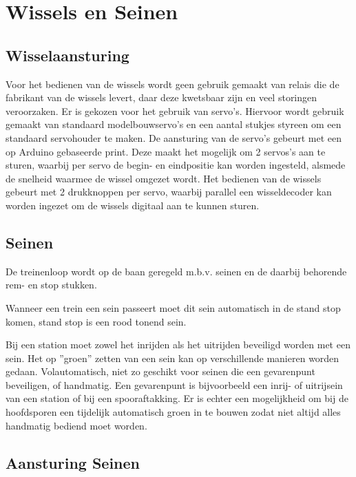 \documentclass[12pt,a4paper]{report}
\begin{document}
\chapter{Wissels en Seinen}
\label{ch:beveiliging}

\section{Wisselaansturing}
Voor het bedienen van de wissels wordt geen gebruik gemaakt van relais die de fabrikant van de wissels levert, daar deze kwetsbaar zijn en veel storingen veroorzaken. Er is gekozen voor het gebruik van servo's. Hiervoor wordt gebruik gemaakt van standaard modelbouwservo's en een aantal stukjes styreen om een standaard servohouder te maken. De aansturing van de servo's gebeurt met een op Arduino gebaseerde print. Deze maakt het mogelijk om 2 servos's aan te sturen, waarbij per servo de begin- en eindpositie kan worden ingesteld, alsmede de snelheid waarmee de wissel omgezet wordt. Het bedienen van de wissels gebeurt met 2 drukknoppen per servo, waarbij parallel een wisseldecoder kan worden ingezet om de wissels digitaal aan te kunnen sturen.

\section{Seinen}

De treinenloop wordt op de baan geregeld m.b.v. seinen en de daarbij behorende rem- en stop stukken.

Wanneer een trein een sein passeert moet dit sein automatisch in de stand stop komen,
stand stop is een rood tonend sein.

Bij een station moet zowel het inrijden als het uitrijden beveiligd worden met een sein. Het op ''groen'' zetten van een sein kan op verschillende manieren worden gedaan. Volautomatisch, niet zo geschikt voor seinen die een gevarenpunt beveiligen, of handmatig.
Een gevarenpunt is bijvoorbeeld een inrij- of uitrijsein van een station of bij een spooraftakking. Er is echter een mogelijkheid om bij de hoofdsporen een tijdelijk automatisch groen in te bouwen zodat niet altijd alles handmatig bediend moet worden.
\section{Aansturing Seinen}
\end{document}
